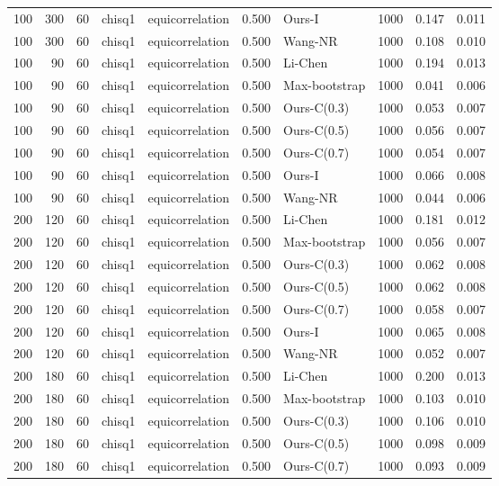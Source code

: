 \begin{tabular}{rrrllrlrrr}
100 & 300 & 60 & chisq1 & equicorrelation & 0.500 & Ours-I & 1000 & 0.147 & 0.011 \\
100 & 300 & 60 & chisq1 & equicorrelation & 0.500 & Wang-NR & 1000 & 0.108 & 0.010 \\
100 & 90 & 60 & chisq1 & equicorrelation & 0.500 & Li-Chen & 1000 & 0.194 & 0.013 \\
100 & 90 & 60 & chisq1 & equicorrelation & 0.500 & Max-bootstrap & 1000 & 0.041 & 0.006 \\
100 & 90 & 60 & chisq1 & equicorrelation & 0.500 & Ours-C(0.3) & 1000 & 0.053 & 0.007 \\
100 & 90 & 60 & chisq1 & equicorrelation & 0.500 & Ours-C(0.5) & 1000 & 0.056 & 0.007 \\
100 & 90 & 60 & chisq1 & equicorrelation & 0.500 & Ours-C(0.7) & 1000 & 0.054 & 0.007 \\
100 & 90 & 60 & chisq1 & equicorrelation & 0.500 & Ours-I & 1000 & 0.066 & 0.008 \\
100 & 90 & 60 & chisq1 & equicorrelation & 0.500 & Wang-NR & 1000 & 0.044 & 0.006 \\
200 & 120 & 60 & chisq1 & equicorrelation & 0.500 & Li-Chen & 1000 & 0.181 & 0.012 \\
200 & 120 & 60 & chisq1 & equicorrelation & 0.500 & Max-bootstrap & 1000 & 0.056 & 0.007 \\
200 & 120 & 60 & chisq1 & equicorrelation & 0.500 & Ours-C(0.3) & 1000 & 0.062 & 0.008 \\
200 & 120 & 60 & chisq1 & equicorrelation & 0.500 & Ours-C(0.5) & 1000 & 0.062 & 0.008 \\
200 & 120 & 60 & chisq1 & equicorrelation & 0.500 & Ours-C(0.7) & 1000 & 0.058 & 0.007 \\
200 & 120 & 60 & chisq1 & equicorrelation & 0.500 & Ours-I & 1000 & 0.065 & 0.008 \\
200 & 120 & 60 & chisq1 & equicorrelation & 0.500 & Wang-NR & 1000 & 0.052 & 0.007 \\
200 & 180 & 60 & chisq1 & equicorrelation & 0.500 & Li-Chen & 1000 & 0.200 & 0.013 \\
200 & 180 & 60 & chisq1 & equicorrelation & 0.500 & Max-bootstrap & 1000 & 0.103 & 0.010 \\
200 & 180 & 60 & chisq1 & equicorrelation & 0.500 & Ours-C(0.3) & 1000 & 0.106 & 0.010 \\
200 & 180 & 60 & chisq1 & equicorrelation & 0.500 & Ours-C(0.5) & 1000 & 0.098 & 0.009 \\
200 & 180 & 60 & chisq1 & equicorrelation & 0.500 & Ours-C(0.7) & 1000 & 0.093 & 0.009 \\

\end{tabular}
